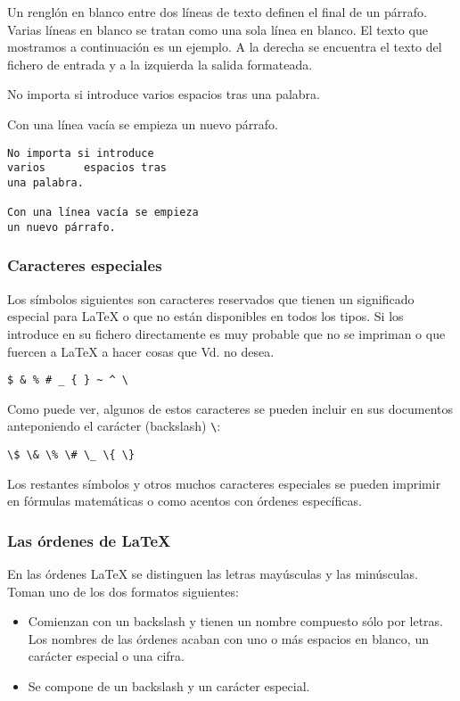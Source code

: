 				Un rengl\'on en blanco entre dos l\'ineas de texto definen el final de un p\'arrafo. Varias l\'ineas en blanco 
				se tratan como una sola l\'inea en blanco. El texto que mostramos a continuaci\'on es un ejemplo. A la derecha 
				se encuentra el texto del fichero de entrada y a la izquierda la salida formateada.\\
				
\begin{minipage}{0,4\linewidth}
No importa si introduce varios espacios
tras una palabra.

Con una l\'inea vac\'ia se empieza un
nuevo p\'arrafo.
\end{minipage}
\hfill\begin{minipage}{0,5\linewidth}
\begin{verbatim}
No importa si introduce
varios      espacios tras
una palabra.

Con una línea vacía se empieza 
un nuevo párrafo.
\end{verbatim}
\end{minipage}
				
				\subsubsection{Caracteres especiales}
				Los s\'imbolos siguientes son caracteres reservados que tienen un significado especial para \LaTeX{} o 
				que no est\'an disponibles en todos los tipos. Si los introduce en su fichero directamente es muy probable 
				que no se impriman o que fuercen a \LaTeX{} a hacer cosas que Vd. no desea.\\
								\begin{center}\verb+$ & % # _ { } ~ ^ \+ \end{center}
				Como puede ver, algunos de estos caracteres se pueden incluir en sus documentos anteponiendo el car\'acter 
				(backslash) \verb+\+:
				 				\begin{center}\verb+\$ \& \% \# \_ \{ \}+ \end{center}
				 				
				Los restantes s\'imbolos y otros muchos caracteres especiales se pueden imprimir en f\'ormulas matem\'aticas 
				o como acentos con \'ordenes espec\'ificas.
				
				\subsubsection{Las \'ordenes de \LaTeX{}}
				En las \'ordenes \LaTeX{} se distinguen las letras may\'usculas y las min\'usculas. Toman uno de los dos 
				formatos siguientes:
						\begin{itemize}
								\item Comienzan con un backslash y tienen un nombre compuesto s\'olo por letras. Los nombres de las 
								\'ordenes acaban con uno o m\'as espacios en blanco, un car\'acter especial o una cifra.
								
								\item Se compone de un backslash y un car\'acter especial. 
						\end{itemize}
 
